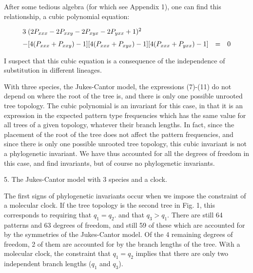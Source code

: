 After some tedious algebra (for which see Appendix 1), one can find this
relationship, a cubic polynomial equation:

\begin{equation} %
\begin{array}{l c c}
\medskip
3 \; (2 P_{xxx} - 2 P_{xxy} - 2 P_{xyx} - 2 P_{yxx} + 1)^2& &\\

 - [4(P_{xxx} + P_{xxy}) -  1] [4(P_{xxx} + P_{xyx}) - 1] [4 (P_{xxx} + P_{yxx}) - 1] &  = &  0
\end{array}
\end{equation}

I suspect that this cubic equation is a consequence of the independence of
substitution in different lineages.

With three species, the Jukes-Cantor model, the expressions (7)-(11) do
not depend on where the root of the tree is, and there is only one
possible unrooted tree topology.  The cubic polynomial is an invariant
for this case, in that it is an expression in the expected pattern type
frequencies which has the same value for all trees of a given topology,
whatever their branch lengths.  In fact, since the placement of the root of
the tree does not affect the pattern frequencies, and since there is
only one possible unrooted tree topology, this cubic invariant is not a
phylogenetic invariant.  We have thus accounted
for all the degrees of freedom in this case, and find invariants, but of course
no phylogenetic invariants.
\bigskip

\centerline{5. The Jukes-Cantor model with 3 species and a clock.}
\medskip

The first signs of phylogenetic invariants occur when we impose the
constraint of a molecular clock.  If the tree topology is
the second tree in Fig. 1, this corresponds to requiring that $q_1 = q_2$.
and that $q_3 > q_1$.  There are still 64 patterns and 63 degrees of
freedom, and still 59 of these which are accounted for by the symmetries
of the Jukes-Cantor model.  Of the 4 remaining degrees of freedom, 2 of them
are accounted for by the branch lengths of the tree.  With a molecular clock,
the constraint that $q_1 = q_2$ implies that there are only two independent
branch lengths ($q_1$ and $q_3$).

